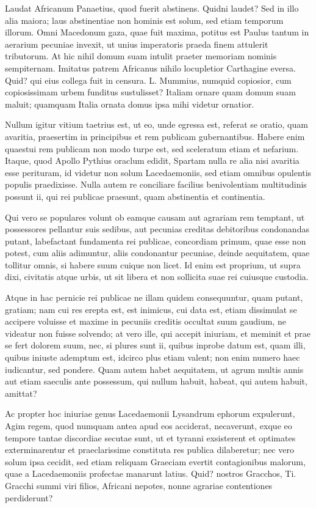  Laudat Africanum Panaetius, quod fuerit abstinens. Quidni laudet? Sed in illo alia maiora; laus abstinentiae non hominis est solum, sed etiam temporum illorum. Omni Macedonum gaza, quae fuit maxima, potitus est Paulus tantum in aerarium pecuniae invexit, ut unius imperatoris praeda finem attulerit tributorum. At hic nihil domum suam intulit praeter memoriam nominis sempiternam. Imitatus patrem Africanus nihilo locupletior Carthagine eversa. Quid? qui eius collega fuit in censura. L. Mummius, numquid copiosior, cum copiosissimam urbem funditus sustulisset? Italiam ornare quam domum suam maluit; quamquam Italia ornata domus ipsa mihi videtur ornatior.

 Nullum igitur vitium taetrius est, ut eo, unde egressa est, referat se oratio, quam avaritia, praesertim in principibus et rem publicam gubernantibus. Habere enim quaestui rem publicam non modo turpe est, sed sceleratum etiam et nefarium. Itaque, quod Apollo Pythius oraclum edidit, Spartam nulla re alia nisi avaritia esse perituram, id videtur non solum Lacedaemoniis, sed etiam omnibus opulentis populis praedixisse. Nulla autem re conciliare facilius benivolentiam multitudinis possunt ii, qui rei publicae praesunt, quam abstinentia et continentia.

 Qui vero se populares volunt ob eamque causam aut agrariam rem temptant, ut possessores pellantur suis sedibus, aut pecunias creditas debitoribus condonandas putant, labefactant fundamenta rei publicae, concordiam primum, quae esse non potest, cum aliis adimuntur, aliis condonantur pecuniae, deinde aequitatem, quae tollitur omnis, si habere suum cuique non licet. Id enim est proprium, ut supra dixi, civitatis atque urbis, ut sit libera et non sollicita suae rei cuiusque custodia.

 Atque in hac pernicie rei publicae ne illam quidem consequuntur, quam putant, gratiam; nam cui res erepta est, est inimicus, cui data est, etiam dissimulat se accipere voluisse et maxime in pecuniis creditis occultat suum gaudium, ne videatur non fuisse solvendo; at vero ille, qui accepit iniuriam, et meminit et prae se fert dolorem suum, nec, si plures sunt ii, quibus inprobe datum est, quam illi, quibus iniuste ademptum est, idcirco plus etiam valent; non enim numero haec iudicantur, sed pondere. Quam autem habet aequitatem, ut agrum multis annis aut etiam saeculis ante possessum, qui nullum habuit, habeat, qui autem habuit, amittat?

 Ac propter hoc iniuriae genus Lacedaemonii Lysandrum ephorum expulerunt, Agim regem, quod numquam antea apud eos acciderat, necaverunt, exque eo tempore tantae discordiae secutae sunt, ut et tyranni exsisterent et optimates exterminarentur et praeclarissime constituta res publica dilaberetur; nec vero solum ipsa cecidit, sed etiam reliquam Graeciam evertit contagionibus malorum, quae a Lacedaemoniis profectae manarunt latius. Quid? nostros Gracchos, Ti. Gracchi summi viri filios, Africani nepotes, nonne agrariae contentiones perdiderunt?

